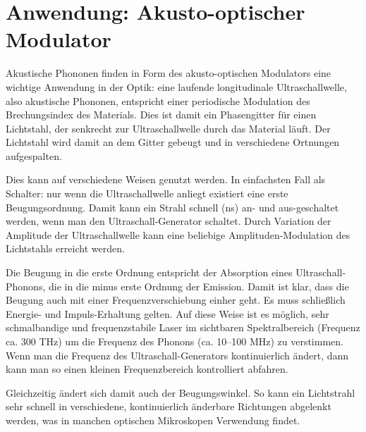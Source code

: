 \section{Anwendung: Akusto-optischer Modulator}

Akustische Phononen finden in Form des  akusto-optischen Modulators eine wichtige Anwendung in der Optik: eine laufende longitudinale Ultraschallwelle, also akustische Phononen, entspricht einer periodische Modulation des Brechungsindex des Materials. Dies ist damit ein Phasengitter für einen Lichtstahl, der senkrecht zur Ultraschallwelle durch das Material läuft. Der Lichtstahl wird damit an dem Gitter gebeugt und in verschiedene Ortnungen aufgespalten.

Dies kann auf verschiedene Weisen genutzt werden. In einfachsten Fall als Schalter: nur wenn die Ultraschallwelle anliegt existiert eine erste Beugungsordnung. Damit kann ein Strahl schnell (ns) an- und aus-geschaltet werden, wenn man den Ultraschall-Generator schaltet. Durch Variation der Amplitude der Ultraschallwelle kann eine beliebige Amplituden-Modulation des Lichtstahls erreicht werden.

Die Beugung in die erste Ordnung entspricht der Absorption eines Ultraschall-Phonons, die in die minus erste Ordnung der Emission. Damit ist klar, dass die Beugung auch mit einer Frequenzverschiebung einher geht. Es muss schließlich Energie- und Impuls-Erhaltung gelten. Auf diese Weise ist es möglich, sehr schmalbandige und frequenzstabile Laser im sichtbaren Spektralbereich (Frequenz ca. 300 THz) um die Frequenz des Phonons (ca. 10--100 MHz) zu verstimmen. Wenn man die Frequenz des  Ultraschall-Generators kontinuierlich ändert, dann kann man so einen kleinen Frequenzbereich kontrolliert abfahren.

Gleichzeitig ändert sich damit auch der Beugungswinkel. So kann ein Lichtstrahl sehr schnell in verschiedene, kontinuierlich änderbare Richtungen abgelenkt werden, was in manchen optischen Mikroskopen Verwendung findet.








\printbibliography[segment=\therefsegment,heading=subbibliography]
